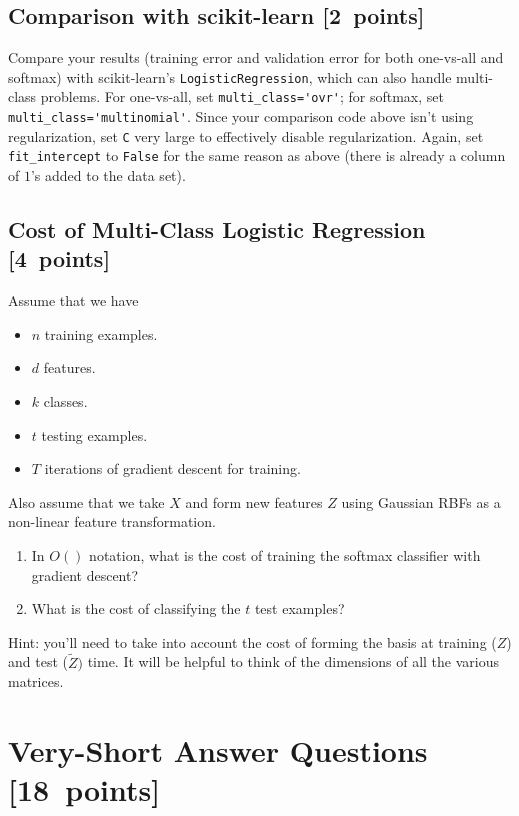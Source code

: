 \documentclass{article}
\newcommand{\blu}[1]{{\textcolor{blu}{#1}}}
\let\ask\blu
\newcommand\pts[1]{\textcolor{pointscolour}{[#1~points]}}
\begin{document}
\subsection{Comparison with scikit-learn \pts{2}}
\ask{Compare your results (training error and validation error for both one-vs-all and softmax) with scikit-learn's \texttt{LogisticRegression}},
which can also handle multi-class problems.
For one-vs-all, set \verb|multi_class='ovr'|; for softmax, set \verb|multi_class='multinomial'|.
Since your comparison code above isn't using regularization, set \verb|C| very large to effectively disable regularization.
Again, set \verb|fit_intercept| to \verb|False| for the same reason as above (there is already a column of $1$'s added to the data set).


\subsection{Cost of Multi-Class Logistic Regression \pts{4}}

Assume that we have
\begin{itemize}
    \item $n$ training examples.
    \item $d$ features.
    \item $k$ classes.
    \item $t$ testing examples.
    \item $T$ iterations of gradient descent for training.
\end{itemize}
Also assume that we take $X$ and form new features $Z$ using Gaussian RBFs as a non-linear feature transformation.
\begin{enumerate}
\item \ask{In $O()$ notation, what is the cost of training the softmax classifier with gradient descent?}
\item \ask{What is the cost of classifying the $t$ test examples?}
\end{enumerate}
Hint: you'll need to take into account the cost of forming the basis at training ($Z$) and test ($\tilde{Z})$ time. It will be helpful to think of the dimensions of all the various matrices.








\clearpage
\section{Very-Short Answer Questions \pts{18}}
\end{document}
